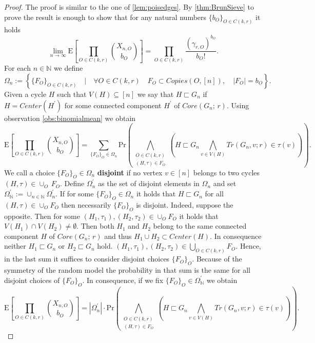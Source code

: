 \documentclass[12pt,notitlepage,a4paper]{article}
\theoremstyle{definition}
\newcommand{\N}{\mathbb{N}}
\newcommand{\Ln}{\lim\limits_{n\to \infty}}
\begin{document}
\begin{proof}
The proof is similar to the one of \cref{lem:poisedges}. 
By \cref{thm:BrunSieve} to prove the result is enough to show
that for any natural numbers $\{b_O\}_{O\in C(k,r)}$ it holds 
\begin{equation} \label{eq:cycl_aux}
\Ln 
\mathrm{E}\left[
\prod_{O\in C(k,r)}
\binom{X_{n,O}}{b_O}
\right]= \prod_{O\in C(k,r)} 
\frac{(\gamma_{r,O})^{b_O}}{b_O!}.
\end{equation}
For each $n\in \N$ we define
\[
\Omega_n:=\left\{
\{F_O\}_{O\in C(k,r)} \quad \Big|
\quad \forall O\in C(k,r) \quad
F_O\subset Copies(O,[n]), \quad
|F_O|=b_O	
\right\}.
\]
Given a cycle $H$ such that $V(H)\subseteq [n]$ we say 
that $H\sqsubset G_n$ if $H=Center(H^\prime)$ for some connected 
component $H^\prime$ of $Core(G_n;\, r)$.
Using observation \cref{obs:binomialmean} we obtain
\[
\mathrm{E}\left[
\prod_{O\in C(k,r)}
\binom{X_{n,O}}{b_O}
\right]=
\sum_{\{F_O\}_{O}\in \Omega_n}
\mathrm{Pr}\left(
\bigwedge_{
	\substack{
		O\in C(k,r)\\
		(H,\tau)\in F_O
}}
\left(
H\sqsubset G_n
\bigwedge_{v\in V(H)}
Tr(G_n,v;r)\in \tau(v)
\right)
\right).
\]
We call a choice $\{F_O\}_O\in \Omega_n$ \textbf{disjoint} if no 
vertex $v\in [n]$ belongs to two cycles $(H,\tau)\in \cup_O \, F_O$. 
Define $\Omega_n^\prime$ as the set of disjoint elements in $\Omega_n$
and set $\Omega_\N^\prime:=\cup_{n\in \N} \Omega^\prime_n$.
If for some $\{F_O\}_O\in \Omega_n$ it holds that $H \sqsubset G_n$
for all $(H,\tau)\in \cup_O F_O$ then necessarily $\{F_O\}_O$ is disjoint. 
Indeed, suppose the opposite. Then for some $(H_1,\tau_1), (H_2,\tau_2)\in \cup_O F_O$ 
it holds that $V(H_1)\cap V(H_2)\neq \emptyset$. Then both $H_1$ and $H_2$ belong
to the same connected component $H$ of $Core(G_n;\,r)$ and thus $H_1\cup H_2\subset
Center(H)$. In consequence neither $H_1\sqsubset G_n$ or $H_2\sqsubset G_n$ hold. 
$(H_1,\tau_1),(H_2,\tau_2)\in \bigcup_{O\in C(k,r)} F_O$. Hence, 
in the last sum it suffices to consider disjoint choices $\{F_O\}_O$. 
Because of the symmetry of the random model the probability
in that sum is the same for all disjoint choices of
$\{F_O\}_O$.
In consequence, if we fix
$\{F_O\}_{O}\in \Omega^\prime_\N$
we obtain
\begin{equation}\label{eq:cycl_aux1}
\mathrm{E}\left[
\prod_{O\in C(k,r)}
\binom{X_{n,O}}{b_O}
\right]=
|\Omega^\prime_n|\cdot
\mathrm{Pr}\left(
\bigwedge_{
	\substack{
		O\in C(k,r)\\
		(H,\tau)\in F_O
}}
\left(
H\sqsubset G_n
\bigwedge_{v\in V(H)}
Tr(G_n,v;r)\in \tau(v)
\right)
\right).
\end{equation}


\end{proof}
\end{document}

